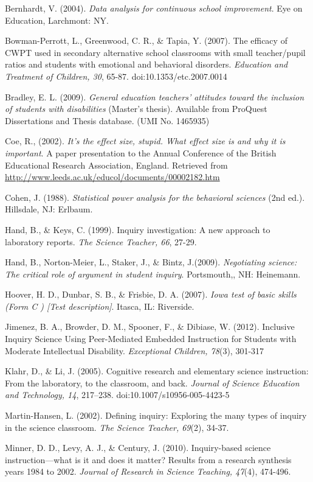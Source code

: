 \documentclass[11.5pt]{sig-alternate} %
\begin{document}
Bernhardt, V. (2004).\textit{ Data analysis for continuous school improvement}.  Eye on Education, 	Larchmont: NY.

Bowman-Perrott, L., Greenwood, C. R., \& Tapia, Y. (2007). The efficacy of CWPT used in 	secondary alternative school classrooms with small teacher/pupil ratios and students with 	emotional and behavioral disorders. \textit{Education and Treatment of Children, 30}, 65-87. doi:10.1353/etc.2007.0014

Bradley, E. L. (2009).  \textit{General education teachers' attitudes toward the inclusion of students 	with disabilities} (Master’s thesis). Available from ProQuest Dissertations and Thesis 	database. (UMI No.  1465935)

Coe, R., (2002). \textit{It’s the effect size, stupid. What effect size is and why it is important}. A paper presentation to the Annual Conference of the British Educational Research Association, England. Retrieved from \url{http://www.leeds.ac.uk/educol/documents/00002182.htm} 

Cohen, J. (1988). \textit{Statistical power analysis for the behavioral sciences} (2nd ed.). Hillsdale, NJ: Erlbaum.

Hand, B., \& Keys, C. (1999). Inquiry investigation: A new approach to laboratory reports. \textit{The Science Teacher, 66}, 27-29.

Hand, B., Norton-Meier, L., Staker, J., \& Bintz, J.(2009).  \textit{Negotiating science: The critical role 	of argument in student inquiry}.  Portsmouth,, NH:  Heinemann.

Hoover, H. D., Dunbar, S. B., \& Frisbie, D. A. (2007).  \textit{Iowa test of basic skills (Form C ) [Test 	description]}. Itasca, IL: Riverside.

Jimenez, B. A., Browder, D. M., Spooner, F., \& Dibiase, W. (2012). Inclusive Inquiry 	Science Using Peer-Mediated Embedded Instruction for Students with Moderate 	Intellectual Disability. \textit{Exceptional Children, 78}(3), 301-317

Klahr, D., \& Li, J. (2005). Cognitive research and elementary science instruction: From the 	laboratory, to the classroom, and back. \textit{Journal of Science Education and Technology, 14}, 217–238. doi:10.1007/s10956-005-4423-5

Martin-Hansen, L. (2002).  Defining inquiry: Exploring the many types of inquiry in the science	classroom.  \textit{The Science Teacher, 69}(2), 34-37.

Minner, D. D., Levy, A. J., \& Century, J. (2010). Inquiry-based science instruction—what is it and does it matter? Results from a research synthesis years 1984 to 2002. \textit{Journal of 	Research in Science Teaching, 47}(4), 474-496.
\end{document}
